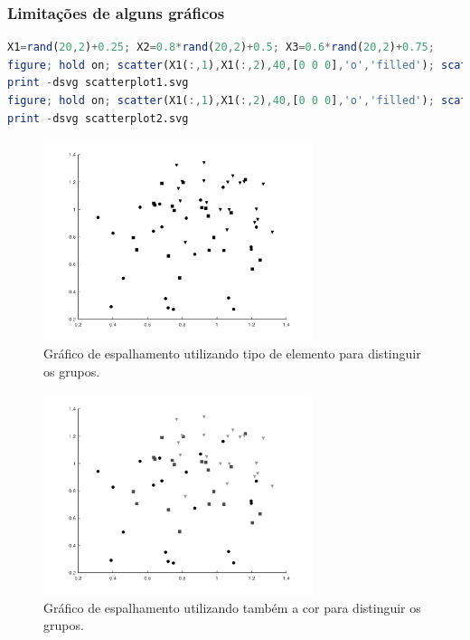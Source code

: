\begin{frame}
\frametitle{Limitações de alguns gráficos}
\begin{lstlisting}[language=Octave, label=lst-scatters, caption={Gráfico de espalhamento com 3 grupos.}, postbreak=\mbox{$\hookrightarrow$\space}, basicstyle=\fontsize{8}{10}\selectfont\ttfamily]
X1=rand(20,2)+0.25; X2=0.8*rand(20,2)+0.5; X3=0.6*rand(20,2)+0.75;
figure; hold on; scatter(X1(:,1),X1(:,2),40,[0 0 0],'o','filled'); scatter(X2(:,1),X2(:,2),40,[0 0 0],'s','filled'); scatter(X3(:,1),X3(:,2),40,[0 0 0],'v','filled'); hold off;
print -dsvg scatterplot1.svg
figure; hold on; scatter(X1(:,1),X1(:,2),40,[0 0 0],'o','filled'); scatter(X2(:,1),X2(:,2),40,[0.3 0.3 0.3],'s','filled'); scatter(X3(:,1),X3(:,2),40,[0.6 0.6 0.6],'v','filled'); hold off;
print -dsvg scatterplot2.svg
\end{lstlisting}

\framebreak 

\begin{figure}[h]
 \centering
  \includegraphics[width=0.7\textwidth,height=0.7\textheight,keepaspectratio]{figures/scatterplot1.pdf}
 \caption{Gráfico de espalhamento utilizando tipo de elemento para distinguir os grupos.}
 \label{fig-scatterplot1}
\end{figure}


\framebreak

\begin{figure}[h]
 \centering
  \includegraphics[width=0.7\textwidth,height=0.7\textheight,keepaspectratio]{figures/scatterplot2.pdf}
 \caption{Gráfico de espalhamento utilizando também a cor para distinguir os grupos.}
 \label{fig-scatterplot2}
\end{figure}

\end{frame}


